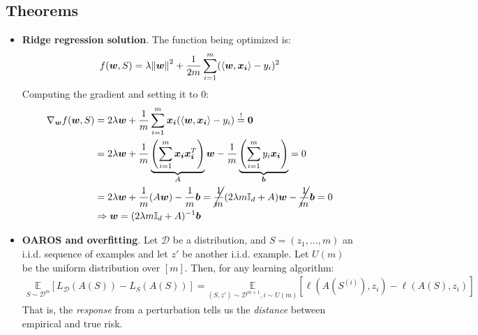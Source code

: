 \documentclass[../template.tex]{subfiles}
\begin{document}
\subsection{Theorems}
\begin{itemize}
    \item \textbf{Ridge regression solution}. The function being optimized is:
    \begin{align*}
        f(\bm{w}, S) = \lambda \norm{\bm{w}}^2 + \frac{1}{2m} \sum_{i=1}^m (\langle \bm{w}, \bm{x_i} \rangle - y_i)^2 
    \end{align*} 
    Computing the gradient and setting it to $0$:
    \begin{align*}
        \nabla_{\bm{w}} f(\bm{w},S) &= 2 \lambda \bm{w} + \frac{1}{m} \sum_{i=1}^m \bm{x_i} (\langle \bm{w}, \bm{x_i} \rangle - y_i)  \overset{!}{=} \bm{0} \\
        &= 2 \lambda \bm{w} + \frac{1}{m} \underbrace{\left(\sum_{i=1}^m \bm{x_i} \bm{x_i}^T\right) }_{A}\bm{w} -\frac{1}{m} \underbrace{\left(\sum_{i=1}^m y_i \bm{x_i}\right) }_{\bm{b}}= 0\\
        &= 2 \lambda \bm{w} + \frac{1}{m}(A \bm{w}) - \frac{1}{m} \bm{b} = \cancel{\frac{1}{m}}(2 \lambda m \mathbb{I}_d + A) \bm{w} - \cancel{\frac{1}{m}} \bm{b} = 0  \\
        &\Rightarrow \bm{w} = (2 \lambda m \mathbb{I}_d + A)^{-1}\bm{b} 
    \end{align*}
    \item \textbf{OAROS and overfitting}. Let $\mathcal{D}$ be a distribution, and $S = (z_1, \dots, m)$ an i.i.d. sequence of examples and let $z'$ be another i.i.d. example. Let $U(m)$ be the uniform distribution over $[m]$. Then, for any learning algorithm:
    \begin{align} \label{eqn:OAROS}
        \underset{S \sim \mathcal{D}^m}{\mathbb{E}} [L_{\mathcal{D}}(A(S)) - L_S(A(S))] = \underset{(S,z') \sim \mathcal{D}^{m+1}, i \sim U(m)}{\mathbb{E}} [\ell(A(S^{(i)}), z_i) - \ell(A(S), z_i)]
    \end{align} 
    That is, the \textit{response} from a perturbation tells us the \textit{distance} between empirical and true risk.
    

\end{itemize}
\end{document}

